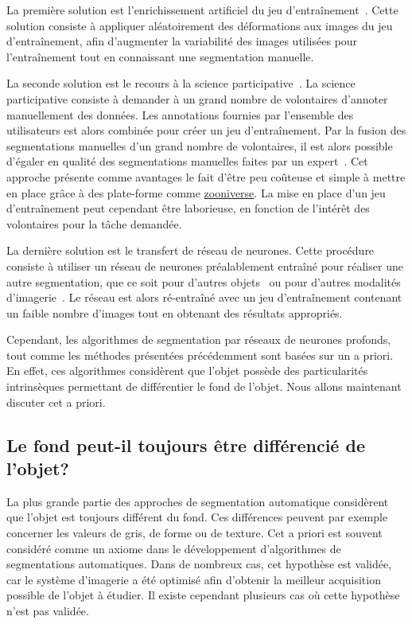 \documentclass[\main/main.tex]{subfiles}
\begin{document}
%
La première solution est l'enrichissement artificiel du jeu d'entraînement~\cite{milletari_2016,zhao_2019b,majurski_2019}.
%
Cette solution consiste à appliquer aléatoirement des déformations aux images du jeu d'entraînement,
afin d'augmenter la variabilité des images utilisées pour l'entraînement tout en connaissant une segmentation manuelle.

%
La seconde solution est le recours à la science participative~\cite{willi_2019,keshavan_2019}.
%
La science participative consiste à demander à un grand nombre de volontaires d'annoter manuellement des données.
%
Les annotations fournies par l'ensemble des utilisateurs est alors combinée pour créer un jeu d'entraînement.
%
Par la fusion des segmentations manuelles d'un grand nombre de volontaires,
il est alors possible d'égaler en qualité des segmentations manuelles faites par un expert~\cite{meakin_2019}.
%
Cet approche présente comme avantages le fait d'être peu coûteuse et simple à mettre en place grâce à des plate\hyp{}forme comme \href{https://www.zooniverse.org/}{zooniverse}.
%
La mise en place d'un jeu d'entraînement peut cependant être laborieuse,
en fonction de l'intérêt des volontaires pour la tâche demandée.

%
La dernière solution est le transfert de réseau de neurones.
%
Cette procédure consiste à utiliser un réseau de neurones préalablement entraîné pour réaliser une autre segmentation, que ce soit pour d'autres objets~\cite{wahab_2019} ou pour d'autres modalités d'imagerie~\cite{guo_2019}.
%
Le réseau est alors ré\hyp{}entraîné avec un jeu d'entraînement contenant un faible nombre d'images tout en obtenant des résultats appropriés.

Cependant, les algorithmes de segmentation par réseaux de neurones profonds, tout comme les méthodes présentées précédemment sont basées sur un a priori.
%
En effet, ces algorithmes considèrent que l'objet possède des particularités intrinsèques permettant de différentier le fond de l'objet.
%
Nous allons maintenant discuter cet a priori.

    \subsection{Le fond peut\hyp{}il toujours être différencié  de l'objet?}

%
La plus grande partie des approches de segmentation automatique considèrent que l'objet est toujours différent du fond. Ces différences peuvent par exemple concerner les valeurs de gris, de forme ou de texture.
%
Cet a priori est souvent considéré comme un axiome dans le développement d'algorithmes de segmentations automatiques.
%
Dans de nombreux cas, cet hypothèse est validée, car le système d'imagerie a été optimisé afin d'obtenir la meilleur acquisition possible de l'objet à étudier.
%
Il existe cependant plusieurs cas où cette hypothèse n'est pas validée.
\end{document}

